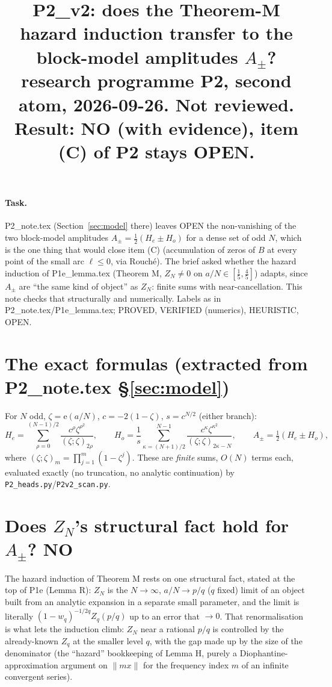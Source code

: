 \documentclass[11pt]{article}
\title{P2\_v2: does the Theorem-M hazard induction transfer to the block-model amplitudes $A_\pm$?\\
\small research programme P2, second atom, 2026-09-26. Not reviewed. Result: NO (with evidence), item (C) of P2 stays OPEN.}
\date{}
\theoremstyle{remark}\newtheorem{remark}[theorem]{Remark}
\newcommand{\e}{\mathrm{e}}
\begin{document}
\maketitle

\paragraph{Task.} P2\_note.tex (Section~\ref{sec:model} there) leaves OPEN the non-vanishing of the two block-model amplitudes
$A_\pm=\frac12(H_e\pm H_o)$ for a dense set of odd $N$, which is the one thing that would close item (C) (accumulation of zeros
of $B$ at every point of the small arc $\ell\le0$, via Rouch\'e). The brief asked whether the hazard induction of P1e\_lemma.tex
(Theorem M, $Z_N\ne0$ on $a/N\in[\frac15,\frac45]$) adapts, since $A_\pm$ are ``the same kind of object'' as $Z_N$: finite sums with
near-cancellation. This note checks that structurally and numerically. Labels as in P2\_note.tex/P1e\_lemma.tex; PROVED, VERIFIED
(numerics), HEURISTIC, OPEN.

\section{The exact formulas (extracted from P2\_note.tex \S\ref{sec:model})}
For $N$ odd, $\zeta=\e(a/N)$, $c=-2(1-\zeta)$, $s=c^{N/2}$ (either branch):
\[H_e=\sum_{\rho=0}^{(N-1)/2}\frac{c^\rho\zeta^{\rho^2}}{(\zeta;\zeta)_{2\rho}},\qquad
H_o=\frac1s\sum_{\kappa=(N+1)/2}^{N-1}\frac{c^\kappa\zeta^{\kappa^2}}{(\zeta;\zeta)_{2\kappa-N}},\qquad
A_\pm=\tfrac12(H_e\pm H_o),\]
where $(\zeta;\zeta)_m=\prod_{j=1}^m(1-\zeta^j)$. These are \emph{finite} sums, $O(N)$ terms each, evaluated exactly (no truncation,
no analytic continuation) by \texttt{P2\_heads.py}/\texttt{P2v2\_scan.py}.

\section{Does $Z_N$'s structural fact hold for $A_\pm$? NO}
The hazard induction of Theorem M rests on one structural fact, stated at the top of P1e (Lemma R): $Z_N$ is the $N\to\infty$,
$a/N\to p/q$ ($q$ fixed) limit of an object built from an analytic expansion in a separate small parameter, and the limit is
literally $(1-w_q)^{-1/2q}Z_q(p/q)$ up to an error that $\to0$. That renormalisation is what lets the induction climb: $Z_N$
near a rational $p/q$ is controlled by the already-known $Z_q$ at the smaller level $q$, with the gap made up by the size of
the denominator (the ``hazard'' bookkeeping of Lemma H, purely a Diophantine-approximation argument on $\|mx\|$ for the
frequency index $m$ of an infinite convergent series).
\end{document}
